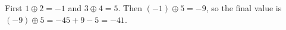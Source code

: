 First $1\oplus2=-1$ and $3\oplus4=5$. Then $(-1)\oplus5=-9$, so the final value is $(-9)\oplus5=-45+9-5=\boxed{-41}$.
